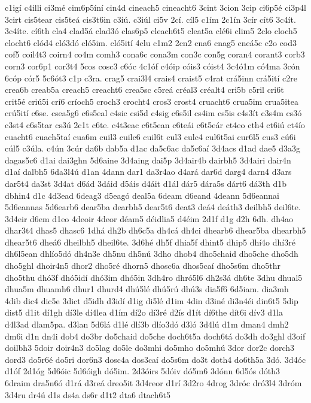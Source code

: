 {c1igí
c4illi
ci3mé
cim6p5íní
cin4d
cineach5
cineacht6
3cint
3cion
3cip
ci6p5é
ci3p4l
3cirt
cis5tear
cis5teá
cis3t6in
c3iú.
c3iúl
ci5v
2cí.
cíl5
c1ím
2c1ín
3cír
cít6
3c4ít.
3c4íte.
cí6th
cla4
clad5á
clad3ó
clas6p5
cleach6t5
cleat5a
clé6i
clim5
2clo
cloch5
clocht6
clód4
cló3dó
cló5im.
cló5ití
4clu
c1m2
2cn2
cna6
cnag5
cneá5c
c2o
cod3
cof5
coil4t3
coirn4
co4m
comh3
cona6c
cona3m
con3c
con5g
coran4
corant3
corb3
corn3
cor6p1
cor3t4
5cos
cosc3
c6óc
4c1óf
c4óip
cóis3
cóist4
3c4ó1m
có4ma
3cón
6cóp
cór5
5c6ót3
c1p
c3ra.
crag5
crai3l4
crais4
craist5
c4rat
crá5inn
crá5ití
c2re
crea6b
creab5a
creach5
creacht6
crea5sc
c5reá
créal3
créalt4
cri5b
c5ril
cri6t
crit5é
criú5i
crí6
críoch5
croch3
crocht4
cros3
crost4
cruacht6
crua5im
crua5itea
crú5ití
c6se.
csea5g6
c6s5eal
c4sic
csi5d
c4sig
c6s5il
cs4im
cs5is
c4s3ít
c3s4m
cs3ó
c3st4
c6s5tar
cs3ú
2c1t
c6te.
c4t3eac
c6t5ean
c6teái
c6t5eár
ct4eo
cth4
ct6iú
ct4ío
cuacht6
cuach5taí
cua6m
cuil3
cuilc6
cuil6t
cul3
culc4
cul6t5ai
cur6l5
cus3
cú6i
cúl5
c3úla.
c4ún
3cúr
da6b
dab5a
d1ac
da5c6ac
da5c6aí
3d4acs
d1ad
dae5
d3a3g
dagas5c6
d1ai
dai3ghn
5d6aine
3d4aing
dai5p
3d4air4b
dairbh5
3d4airi
dair4n
d1aí
dalbh5
6da3l4ú
d1an
4dann
dar1
da3r4ao
d4ará
dar6d
darg4
darn4
d3ars
dar5t4
da3st
3d4at
d6ád
3dáid
d5áis
d4áit
d1ál
dár5
dára5s
dárt6
dá3th
d1b
dbhin4
d1c
4d3ead
6deag3
d5eagó
deal5a
6deam
d6eand
4deann
5d6eannai
5d6eannas
5d6earb6
dear5ba
dearbh5
dear5t6
deat3
deá4
deáth3
deilbh5
deil6te.
3d4eir
d6em
d1eo
4deoir
4deor
déam5
déidlia5
d4éim
2d1f
d1g
d2h
6dh.
dh4ao
dhar3t4
dhas5
dhasc6
1dhá
dh2b
dh6c5a
dh4cá
dh4ci
dhearb6
dhear5ba
dhearbh5
dhear5t6
dheá6
dheilbh5
dheil6te.
3d6hé
dh5f
dhia5f
dhint5
dhip5
dhí4o
dhí3ré
dh6l5ean
dhlío5dó
dh4n3e
dh5nu
dh5nú
3dho
dhob4
dho5chaid
dho5che
dho5dh
dho5ghl
dhoir4n5
dhor2
dho5ré
dhorn5
dhosc6a
dhos5caí
dho5s6m
dho5thr
dho5thu
dhó3f
dhó5idí
dhó3im
dhó5in
3dh4ro
dhró5l6
dh2s3á
dh6te
3dhu
dhual5
dhua5m
dhuamh6
dhur1
dhurd4
dhú5lé
dhú5rú
dhú3s
dia5f6
6d5iam.
dia3mh
4dib
dic4
dic5e
3dict
d5idh
d3idí
d1ig
di5lé
d1im
4din
d3iné
di3n4éi
din6t5
5dip
dist5
d1it
dí1gh
dí3le
dí4lea
d1ím
dí2o
dí3ré
d2ís
d1ít
dí6the
dít6i
dív3
d1la
d4l3ad
dlam5pa.
d3lan
5d6lá
d1lé
dlí3b
dlío3dó
d3ló
3d4lú
d1m
dman4
dmh2
dm6i
d1n
dn4i
dob4
do3br
do5chaid
do5che
doch6t5a
doch6tá
do3dh
do3ghl
d3oif
doilbh3
5doir
doir4n3
do5lag
do5le
do3mhi
do5mho
do5mhú
3dor
dor2c
dorch3
dord3
do5r6é
do5ri
dor6n3
dosc4a
dos3caí
do5s6m
do3t
doth4
do6th5a
3dó.
3d4óc
d1óf
2d1óg
5d6óic
5d6óigh
dó5im.
2d3óirs
5dóiv
dó5m6
3dónn
6d5ós
dóth3
6draim
dra5n6ó
d1rá
d3reá
dreo5it
3d4reor
d1rí
3d2ro
4drog
3dróc
dró3l4
3dróm
3d4ru
dr4ú
d1s
ds4a
ds6r
d1t2
dta6
dtach6t5
}
